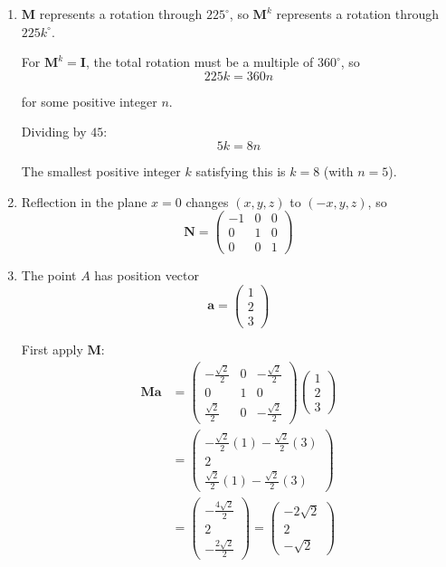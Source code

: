 \documentclass[leqno]{article}
\begin{document}
\begin{enumerate}[
  label=\textbf{\arabic*.},
  leftmargin=*,
  topsep=0pt,
  partopsep=0pt,
  parsep=0pt
]
\begin{djsSolution}
\begin{enumerate}[label=\textbf{(\alph*)}]
Comparing this with \(\mathbf M\) gives
\[
\cos\alpha^\circ=-\frac{\sqrt2}{2},
\qquad
\sin\alpha^\circ=-\frac{\sqrt2}{2}
\]

So \(\alpha^\circ\) is in the third quadrant, hence
\[
\alpha=225
\]

\item \(\mathbf M\) represents a rotation through \(225^\circ\), so \(\mathbf M^k\) represents a rotation through \(225k^\circ\).

For \(\mathbf M^k=\mathbf I\), the total rotation must be a multiple of \(360^\circ\), so
\[
225k=360n
\]

for some positive integer \(n\).

Dividing by \(45\):
\[
5k=8n
\]

The smallest positive integer \(k\) satisfying this is \(k=8\) (with \(n=5\)).

\item Reflection in the plane \(x=0\) changes \((x,y,z)\) to \((-x,y,z)\), so
\[
\mathbf N=
\begin{pmatrix}
-1&0&0\\
0&1&0\\
0&0&1
\end{pmatrix}
\]

\item The point \(A\) has position vector
\[
\mathbf a=
\begin{pmatrix}
1\\
2\\
3
\end{pmatrix}
\]

First apply \(\mathbf M\):
\begin{align*}
\mathbf M\mathbf a
&=
\begin{pmatrix}
-\frac{\sqrt2}{2} & 0 & -\frac{\sqrt2}{2} \\
0 & 1 & 0 \\
\frac{\sqrt2}{2} & 0 & -\frac{\sqrt2}{2}
\end{pmatrix}
\begin{pmatrix}
1\\
2\\
3
\end{pmatrix} \\
&=
\begin{pmatrix}
-\frac{\sqrt2}{2}(1)-\frac{\sqrt2}{2}(3)\\
2\\
\frac{\sqrt2}{2}(1)-\frac{\sqrt2}{2}(3)
\end{pmatrix} \\
&=
\begin{pmatrix}
-\frac{4\sqrt2}{2}\\
2\\
-\frac{2\sqrt2}{2}
\end{pmatrix}
=
\begin{pmatrix}
-2\sqrt2\\
2\\
-\sqrt2
\end{pmatrix}
\end{align*}


\end{enumerate}
\end{djsSolution}
\end{enumerate}
\end{document}
